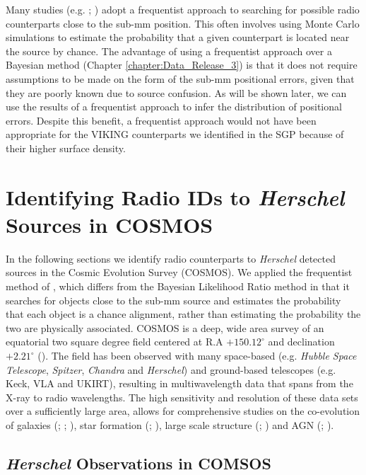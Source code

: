 Many studies (e.g. \citealt{Eales_2009}; \citealt{Dye_2009}) adopt a frequentist approach to searching for possible radio counterparts close to the sub-mm position. This often involves using Monte Carlo simulations to estimate the probability that a given counterpart is located near the source by chance. The advantage of using a frequentist approach over a Bayesian method (Chapter \ref{chapter:Data_Release_3}) is that it does not require assumptions to be made on the form of the sub-mm positional errors, given that they are poorly known due to source confusion. As will be shown later, we can use the results of a frequentist approach to infer the distribution of positional errors. Despite this benefit, a frequentist approach would not have been appropriate for the VIKING counterparts we identified in the SGP because of their higher surface density.

\section{Identifying Radio IDs to \textit{Herschel} Sources in COSMOS}

In the following sections we identify radio counterparts to \textit{Herschel} detected sources in the Cosmic Evolution Survey (COSMOS). We applied the frequentist method of \citealt{Lilly_1999}, which differs from the Bayesian Likelihood Ratio method in that it searches for objects close to the sub-mm source and estimates the probability that each object is a chance alignment, rather than estimating the probability the two are physically associated. COSMOS is a deep, wide area survey of an equatorial two square degree field centered at R.A $+150.12^{\circ}$ and declination $+2.21^{\circ}$ (\citealt{Scoville_2007}). The field has been observed with many space-based (e.g. \textit{Hubble Space Telescope}, \textit{Spitzer}, \textit{Chandra} and \textit{Herschel}) and ground-based telescopes (e.g. Keck, VLA and UKIRT), resulting in multiwavelength data that spans from the X-ray to radio wavelengths. The high sensitivity and resolution of these data sets over a sufficiently large area, allows for comprehensive studies on the co-evolution of galaxies (\citealt{Schreiber_2018}; \citealt{Stockmann_2020}; \citealt{Valentino_2020a}), star formation (\citealt{Gruppioni_2013}; \citealt{Novak_2017}), large scale structure (\citealt{Scoville_2013}; \citealt{Laigle_2018}) and AGN (\citealt{Prescott_2006}; \citealt{Heintz_2016}). 

\subsection{\textit{Herschel} Observations in COMSOS}

